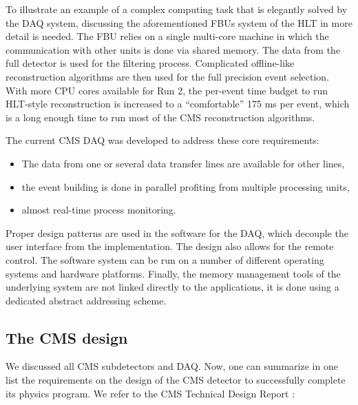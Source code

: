 \begin{normalsize}
To illustrate an example of a complex computing task that is elegantly solved by the DAQ system, discussing the aforementioned FBUs system of the HLT in more detail is needed. The FBU relies on a single multi-core machine in which the communication with other units is done via shared memory. The data from the full detector is used for the filtering process. Complicated offline-like reconstruction algorithms are then used for the full precision event selection. With more CPU cores available for Run 2, the per-event time budget to run HLT-style reconstruction is increased to a ``comfortable'' 175 ms per event, which is a long enough time to run most of the CMS reconstruction algorithms. 

The current CMS DAQ was developed to address these core requirements: 

\begin{itemize}
\item The data from one or several data transfer lines are available for other lines,
\item the event building is done in parallel profiting from multiple processing units,
\item almost real-time process monitoring.
\end{itemize}


Proper design patterns are used in the software for the DAQ, which decouple the user  interface from the implementation. The design also allows for the remote control. The  software  system  can be run on a number of different  operating  systems  and  hardware  platforms.   Finally, the memory  management  tools  of  the  underlying  system  are not linked directly to the applications, it is done using a dedicated abstract addressing  scheme.

  
\subsection{The CMS design}

We discussed all CMS subdetectors and DAQ. Now, one can summarize in one list the requirements on the design of the CMS detector to successfully complete its physics program. We refer to the CMS Technical Design Report \cite{CMS_TDR}: 


\end{normalsize}
